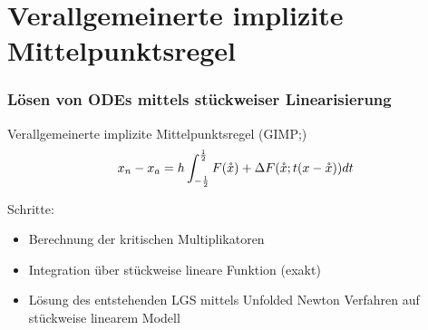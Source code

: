 \section[GIMP]{Verallgemeinerte implizite Mittelpunktsregel}
\begin{frame}[<+->]
\frametitle{Lösen von ODEs mittels stückweiser Linearisierung}
 \begin{block}{Verallgemeinerte implizite Mittelpunktsregel (GIMP;\cite[Eq. 14]{monster})}
 \[
  x_n - x_a = h\int_{-\frac{1}{2}}^{\frac{1}{2}} F(\mathring{x}) + \Delta F(\mathring{x}; t(x-\mathring{x}))dt
 \]
\end{block}
Schritte:
\begin{itemize}
 \item Berechnung der kritischen Multiplikatoren
 \item Integration über stückweise lineare Funktion (exakt)
 \item Lösung des entstehenden LGS mittels Unfolded Newton Verfahren auf stückweise linearem Modell
\end{itemize}

\end{frame}

